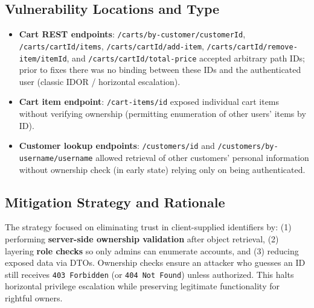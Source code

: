 \documentclass[]{UCD_CS_FYP_Report}
\begin{document}
\subsection*{Vulnerability Locations and Type}
\begin{itemize}
	\item \textbf{Cart REST endpoints}: \texttt{/carts/by-customer/{customerId}}, \texttt{/carts/{cartId}/items}, \texttt{/carts/{cartId}/add-item}, \texttt{/carts/{cartId}/remove-item/{itemId}}, and \texttt{/carts/{cartId}/total-price} accepted arbitrary path IDs; prior to fixes there was no binding between these IDs and the authenticated user (classic IDOR / horizontal escalation).
	\item \textbf{Cart item endpoint}: \texttt{/cart-items/{id}} exposed individual cart items without verifying ownership (permitting enumeration of other users' items by ID).\newline
	\item \textbf{Customer lookup endpoints}: \texttt{/customers/{id}} and \texttt{/customers/by-username/{username}} allowed retrieval of other customers' personal information without ownership check (in early state) relying only on being authenticated.
\end{itemize}

\subsection*{Mitigation Strategy and Rationale}
The strategy focused on eliminating trust in client-supplied identifiers by: (1) performing \textbf{server-side ownership validation} after object retrieval, (2) layering \textbf{role checks} so only admins can enumerate accounts, and (3) reducing exposed data via DTOs. Ownership checks ensure an attacker who guesses an ID still receives \texttt{403 Forbidden} (or \texttt{404 Not Found}) unless authorized. This halts horizontal privilege escalation while preserving legitimate functionality for rightful owners.
\end{document}
